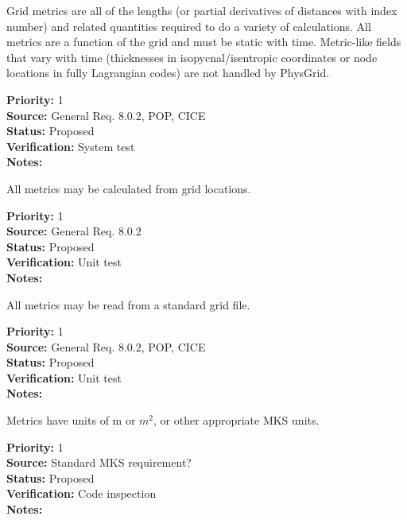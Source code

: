 Grid metrics are all of the lengths (or partial derivatives of distances with
index number) and related quantities required to do a variety of calculations. 
All metrics are a function of the grid and must be static with time.  Metric-like
fields that vary with time (thicknesses in isopycnal/isentropic coordinates
or node locations in fully Lagrangian codes) are not handled by PhysGrid.
\begin{reqlist}
{\bf Priority:} 1 \\
{\bf Source:} General Req. 8.0.2, POP, CICE \\
{\bf Status:} Proposed \\
{\bf Verification:} System test\\
{\bf Notes:} 
\end{reqlist}

All metrics may be calculated from grid locations.
\begin{reqlist}
{\bf Priority:} 1 \\
{\bf Source:} General Req. 8.0.2 \\
{\bf Status:} Proposed \\
{\bf Verification:} Unit test\\
{\bf Notes:} 
\end{reqlist}

All metrics may be read from a standard grid file.
\begin{reqlist}
{\bf Priority:} 1 \\
{\bf Source:} General Req. 8.0.2, POP, CICE \\
{\bf Status:} Proposed \\
{\bf Verification:} Unit test\\
{\bf Notes:} 
\end{reqlist}

Metrics have units of m or $m^2$, or other appropriate MKS units.
\begin{reqlist}
{\bf Priority:} 1 \\
{\bf Source:} Standard MKS requirement? \\
{\bf Status:} Proposed \\
{\bf Verification:} Code inspection \\
{\bf Notes:} 
\end{reqlist}


